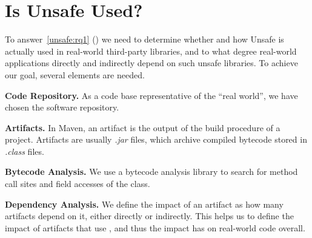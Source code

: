 \section{Is Unsafe Used?}
\label{sec:unsafe:overview}

To answer~\ref{unsafe:rq1} (\emph{\urqA})
we need to determine whether and how Unsafe is actually used in real-world third-party \java{} libraries,
and to what degree real-world applications directly and indirectly depend on such unsafe libraries.
To achieve our goal, several elements are needed.

\textbf{Code Repository.}
As a code base representative of the ``real world'',
we have chosen the \mavencentral{} software repository.

\textbf{Artifacts.}
In Maven, an artifact is the output of the build procedure of a project.
Artifacts are usually \emph{.jar} files,
which archive compiled \java{} bytecode stored in \emph{.class} files.

\textbf{Bytecode Analysis.}
We use a bytecode analysis library to search for method call sites and field accesses of the  class.

\textbf{Dependency Analysis.}
We define the impact of an artifact as how many artifacts depend on it,
either directly or indirectly.
This helps us to define the impact of artifacts that use ,
and thus the impact  has on real-world code overall.


